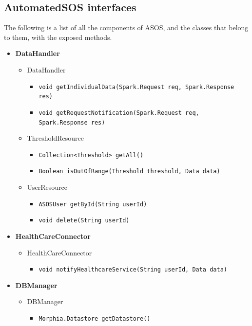 \documentclass[a4paper, hidelinks, 12pt]{report}
\begin{document}
	\subsection{AutomatedSOS interfaces}
	The following is a list of all the components of ASOS, and the classes that belong to them, with the exposed methods.
	\begin{itemize}
		\item{\textbf{DataHandler}}
			\begin{itemize}
				\item{DataHandler}
					\begin{itemize}
						\item{\verb|void getIndividualData(Spark.Request req, Spark.Response res)|}
						\item{\verb|void getRequestNotification(Spark.Request req, Spark.Response res)|}
					\end{itemize}
					\item{ThresholdResource}
					\begin{itemize}
						\item{\verb|Collection<Threshold> getAll()|}
						\item{\verb|Boolean isOutOfRange(Threshold threshold, Data data)|}
					\end{itemize}
					\item{UserResource}
					\begin{itemize}
						\item{\verb|ASOSUser getById(String userId)|}
						\item{\verb|void delete(String userId)|}
					\end{itemize}
			\end{itemize}
		\item{\textbf{HealthCareConnector}}
			\begin{itemize}
				\item{HealthCareConnector}
					\begin{itemize}
						\item{\verb|void notifyHealthcareService(String userId, Data data)|}
					\end{itemize}
			\end{itemize}
		\item{\textbf{DBManager}}
			\begin{itemize}
				\item{DBManager}
					\begin{itemize}
						\item{\verb|Morphia.Datastore getDatastore()|}
					\end{itemize}
			\end{itemize}
	\end{itemize}
	
\end{document}
